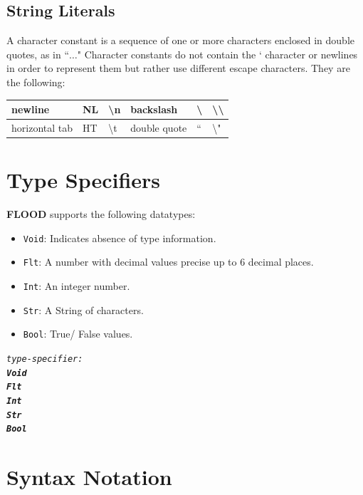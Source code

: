 \documentclass[12pt]{report}
\begin{document}
\subsection{String Literals}

A character constant is a sequence of one or more characters enclosed in double quotes, as in ``$\ldots$" Character constants do not contain the ` character or newlines in order to represent them but rather use different escape characters. They are the following:

\begin{center}
\begin{tabular}{ | l | l | l | l | l | l | }
\hline
newline & NL & \textbackslash{n} & backslash & \textbackslash & \textbackslash\textbackslash \\
\hline
horizontal tab & HT & \textbackslash{t} & double quote & `` & \textbackslash" \\
\hline
\end{tabular}
\end{center}

\section{Type Specifiers}

\textbf{FLOOD} supports the following datatypes:
\begin{itemize}
\item \texttt{Void}: Indicates absence of type information.
\item \texttt{Flt}: A number with decimal values precise up to 6 decimal places.
\item \texttt{Int}: An integer number.
\item \texttt{Str}: A String of characters.
\item \texttt{Bool}: True/ False values.
\end{itemize}
\begin{alltt}\begin{singlespace}
         \textit{type-specifier:}
              \textit{\textbf{Void}}
              \textit{\textbf{Flt}}
              \textit{\textbf{Int}}
              \textit{\textbf{Str}}
              \textit{\textbf{Bool}}\end{singlespace}
\end{alltt}

\section{Syntax Notation}
\end{document}

